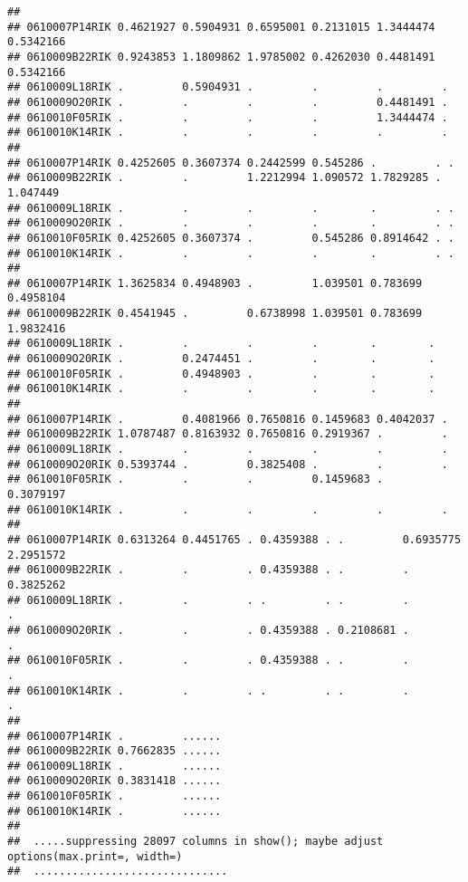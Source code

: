 \documentclass[
]{article}
\begin{document}
\begin{verbatim}
##                                                                          
## 0610007P14RIK 0.4621927 0.5904931 0.6595001 0.2131015 1.3444474 0.5342166
## 0610009B22RIK 0.9243853 1.1809862 1.9785002 0.4262030 0.4481491 0.5342166
## 0610009L18RIK .         0.5904931 .         .         .         .        
## 0610009O20RIK .         .         .         .         0.4481491 .        
## 0610010F05RIK .         .         .         .         1.3444474 .        
## 0610010K14RIK .         .         .         .         .         .        
##                                                                          
## 0610007P14RIK 0.4252605 0.3607374 0.2442599 0.545286 .         . .       
## 0610009B22RIK .         .         1.2212994 1.090572 1.7829285 . 1.047449
## 0610009L18RIK .         .         .         .        .         . .       
## 0610009O20RIK .         .         .         .        .         . .       
## 0610010F05RIK 0.4252605 0.3607374 .         0.545286 0.8914642 . .       
## 0610010K14RIK .         .         .         .        .         . .       
##                                                                        
## 0610007P14RIK 1.3625834 0.4948903 .         1.039501 0.783699 0.4958104
## 0610009B22RIK 0.4541945 .         0.6738998 1.039501 0.783699 1.9832416
## 0610009L18RIK .         .         .         .        .        .        
## 0610009O20RIK .         0.2474451 .         .        .        .        
## 0610010F05RIK .         0.4948903 .         .        .        .        
## 0610010K14RIK .         .         .         .        .        .        
##                                                                          
## 0610007P14RIK .         0.4081966 0.7650816 0.1459683 0.4042037 .        
## 0610009B22RIK 1.0787487 0.8163932 0.7650816 0.2919367 .         .        
## 0610009L18RIK .         .         .         .         .         .        
## 0610009O20RIK 0.5393744 .         0.3825408 .         .         .        
## 0610010F05RIK .         .         .         0.1459683 .         0.3079197
## 0610010K14RIK .         .         .         .         .         .        
##                                                                              
## 0610007P14RIK 0.6313264 0.4451765 . 0.4359388 . .         0.6935775 2.2951572
## 0610009B22RIK .         .         . 0.4359388 . .         .         0.3825262
## 0610009L18RIK .         .         . .         . .         .         .        
## 0610009O20RIK .         .         . 0.4359388 . 0.2108681 .         .        
## 0610010F05RIK .         .         . 0.4359388 . .         .         .        
## 0610010K14RIK .         .         . .         . .         .         .        
##                               
## 0610007P14RIK .         ......
## 0610009B22RIK 0.7662835 ......
## 0610009L18RIK .         ......
## 0610009O20RIK 0.3831418 ......
## 0610010F05RIK .         ......
## 0610010K14RIK .         ......
## 
##  .....suppressing 28097 columns in show(); maybe adjust options(max.print=, width=)
##  ..............................
\end{verbatim}
\end{document}
